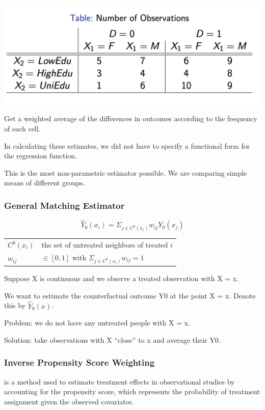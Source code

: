 \documentclass[a3paper, 8pt]{extarticle}
\begin{document}
\begin{multicols*}{5}
\begin{center}
    \includegraphics[width = 0.9 \columnwidth]{Screen Shot 2023-03-23 at 19.23.44.png}
\end{center}

Get a weighted average of the differences in outcomes according to the frequency of each cell.

In calculating these estimates, we did not have to specify a functional form for the regression function.

This is the most non-parametric estimator possible. We are comparing simple means of different groups.

\subsubsection{General Matching Estimator}
$$\hat{Y}_0(x_i)=\Sigma_{j\in C^0(x_i)} w_{ij}Y_0(x_j)$$

\begin{tabular}{l l}
  $C^0(x_i)$   & the set of untreated neighbors of treated $i$\\
   $w_{ij}$  & $\in [0,1]$ with $\Sigma_{j \in C^0(x_i)}w_{ij}=1$
\end{tabular}

Suppose X is continuous and we observe a treated observation with X = x.

We want to estimate the counterfactual outcome Y0 at the point X = x. Denote this by $\hat{Y}_0(x)$.

Problem: we do not have any untreated people with X = x.

Solution: take observations with X “close” to x and average their Y0.


\subsubsection{Inverse Propensity Score Weighting}
is a method used to estimate treatment effects in observational studies by accounting for the propensity score, which represents the probability of treatment assignment given the observed covariates. 


\end{multicols*}
\end{document}
